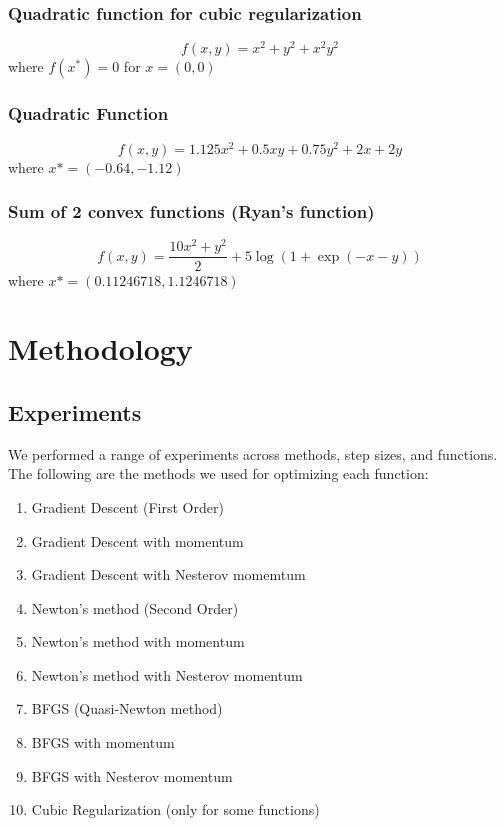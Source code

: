 \documentclass{article}
\begin{document}
\subsubsection{Quadratic function for cubic regularization}
\begin{equation}
f(x,y) = x^2 +y^2 + x^2y^2
\end{equation}
where $f(x^*) = 0$ for $x = (0,0)$

\subsubsection{Quadratic Function}
\begin{equation}
f(x,y) = 1.125x^2 + 0.5xy + 0.75y^2 + 2x + 2y
\end{equation}
where $x* = (-0.64,-1.12)$

\subsubsection{Sum of 2 convex functions (Ryan's function)}
\begin{equation}
f(x,y) = \frac{10x^2 + y^2}{2} + 5\log(1+\exp(-x-y))
\end{equation}
where $x* = (0.11246718,1.1246718)$



\section{Methodology}\label{experiments}

\subsection{Experiments}
We performed a range of experiments across methods, step sizes, and functions. The following are the methods we used for optimizing each function:
\begin{enumerate}
	\item Gradient Descent (First Order)
	\item Gradient Descent with momentum
	\item Gradient Descent with Nesterov momemtum
	\item Newton's method (Second Order)
	\item Newton's method with momentum 
	\item Newton's method with Nesterov momentum
	\item BFGS (Quasi-Newton method)
	\item BFGS with momentum
	\item BFGS with Nesterov momentum
	\item Cubic Regularization (only for some functions)
\end{enumerate}
\end{document}

